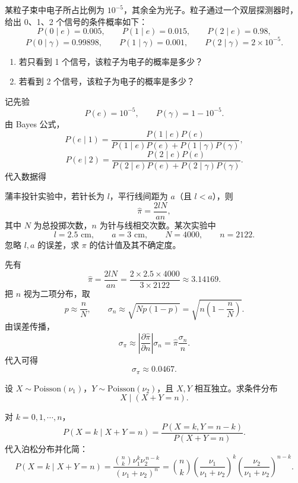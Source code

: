 \begin{question}
某粒子束中电子所占比例为 $10^{-5}$，其余全为光子。粒子通过一个双层探测器时，给出 0、1、2 个信号的条件概率如下：
\[
P(0\mid e)=0.005,\qquad P(1\mid e)=0.015,\qquad P(2\mid e)=0.98,
\]
\[
P(0\mid \gamma)=0.99898,\qquad P(1\mid \gamma)=0.001,\qquad P(2\mid \gamma)=2\times10^{-5}.
\]
\begin{enumerate}
\item 若只看到 1 个信号，该粒子为电子的概率是多少？
\item 若看到 2 个信号，该粒子为电子的概率是多少？
\end{enumerate}
\begin{solution}
记先验
\[
P(e)=10^{-5},\qquad P(\gamma)=1-10^{-5}.
\]
由 Bayes 公式，
\[
P(e\mid 1)=\frac{P(1\mid e)P(e)}{P(1\mid e)P(e)+P(1\mid \gamma)P(\gamma)},
\]
\[
P(e\mid 2)=\frac{P(2\mid e)P(e)}{P(2\mid e)P(e)+P(2\mid \gamma)P(\gamma)}.
\]
代入数据得
\end{solution}
\end{question}

\begin{question}
蒲丰投针实验中，若针长为 $l$，平行线间距为 $a$（且 $l<a$），则
\[
\hat\pi=\frac{2lN}{an},
\]
其中 $N$ 为总投掷次数，$n$ 为针与线相交次数。某次实验中
\[
l=2.5\text{ cm},\qquad a=3\text{ cm},\qquad N=4000,\qquad n=2122.
\]
忽略 $l,a$ 的误差，求 $\pi$ 的估计值及其不确定度。
\begin{solution}
先有
\[
\hat\pi=\frac{2lN}{an}
=\frac{2\times 2.5\times 4000}{3\times 2122}
\approx 3.14169.
\]
把 $n$ 视为二项分布，取
\[
p\approx \frac{n}{N},
\qquad
\sigma_n\approx \sqrt{Np(1-p)}
=\sqrt{n\left(1-\frac{n}{N}\right)}.
\]
由误差传播，
\[
\sigma_{\pi}\approx \left|\frac{\partial \hat\pi}{\partial n}\right|\sigma_n
=\hat\pi\frac{\sigma_n}{n}.
\]
代入可得
\[
\sigma_\pi\approx 0.0467.
\]
\end{solution}
\end{question}

\begin{question}
设 $X\sim \mathrm{Poisson}(\nu_1)$，$Y\sim \mathrm{Poisson}(\nu_2)$，且 $X,Y$ 相互独立。求条件分布
\[
X\mid (X+Y=n).
\]
\begin{solution}
对 $k=0,1,\cdots,n$，
\[
P(X=k\mid X+Y=n)
=\frac{P(X=k,Y=n-k)}{P(X+Y=n)}.
\]
代入泊松分布并化简：
\[
P(X=k\mid X+Y=n)
=\frac{\binom{n}{k}\nu_1^k\nu_2^{\,n-k}}{(\nu_1+\nu_2)^n}
=\binom{n}{k}\left(\frac{\nu_1}{\nu_1+\nu_2}\right)^k
\left(\frac{\nu_2}{\nu_1+\nu_2}\right)^{n-k}.
\]
\end{solution}
\end{question}

